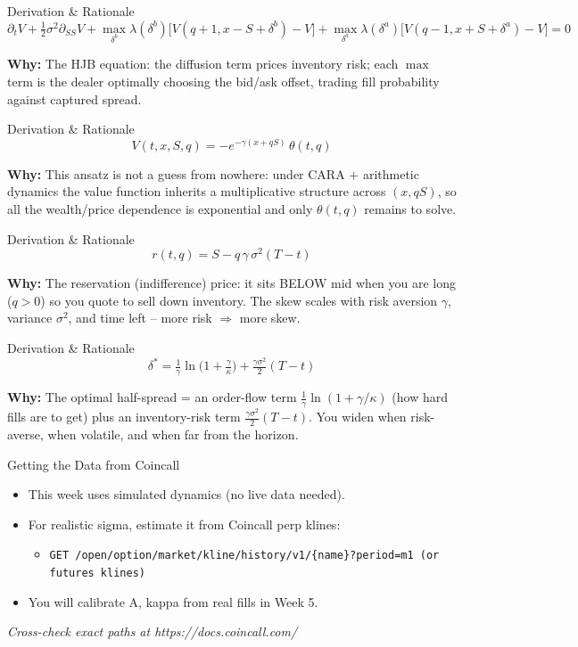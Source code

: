 \documentclass[aspectratio=169,10pt]{beamer}
\begin{document}
\begin{frame}{Derivation \& Rationale}
\[\partial_t V + \tfrac12\sigma^2 \partial_{SS} V + \max_{\delta^b}\lambda(\delta^b)\big[V(q{+}1,x{-}S{+}\delta^b)-V\big]+ \max_{\delta^a}\lambda(\delta^a)\big[V(q{-}1,x{+}S{+}\delta^a)-V\big]=0\]

\small\textbf{\color{ncsured}Why:} The HJB equation: the diffusion term prices inventory risk; each $\max$ term is the dealer optimally choosing the bid/ask offset, trading fill probability against captured spread.
\end{frame}

\begin{frame}{Derivation \& Rationale}
\[V(t,x,S,q) = -e^{-\gamma(x+qS)}\,\theta(t,q)\]

\small\textbf{\color{ncsured}Why:} This ansatz is not a guess from nowhere: under CARA $+$ arithmetic dynamics the value function inherits a multiplicative structure across $(x, qS)$, so all the wealth/price dependence is exponential and only $\theta(t,q)$ remains to solve.
\end{frame}

\begin{frame}{Derivation \& Rationale}
\[r(t,q) = S - q\,\gamma\,\sigma^2 (T-t)\]

\small\textbf{\color{ncsured}Why:} The reservation (indifference) price: it sits BELOW mid when you are long ($q>0$) so you quote to sell down inventory. The skew scales with risk aversion $\gamma$, variance $\sigma^2$, and time left -- more risk $\Rightarrow$ more skew.
\end{frame}

\begin{frame}{Derivation \& Rationale}
\[\delta^* = \tfrac{1}{\gamma}\ln\!\big(1+\tfrac{\gamma}{\kappa}\big) + \tfrac{\gamma\sigma^2}{2}(T-t)\]

\small\textbf{\color{ncsured}Why:} The optimal half-spread = an order-flow term $\tfrac1\gamma\ln(1+\gamma/\kappa)$ (how hard fills are to get) plus an inventory-risk term $\tfrac{\gamma\sigma^2}{2}(T-t)$. You widen when risk-averse, when volatile, and when far from the horizon.
\end{frame}

\begin{frame}{Getting the Data from Coincall}
\begin{itemize}
  \item This week uses simulated dynamics (no live data needed).
  \item For realistic sigma, estimate it from Coincall perp klines:
  \begin{itemize}\item \texttt{\small GET /open/option/market/kline/history/v1/\{name\}?period=m1  (or futures klines)}\end{itemize}
  \item You will calibrate A, kappa from real fills in Week 5.
\end{itemize}
\vspace{2pt}\tiny\textit{Cross-check exact paths at https://docs.coincall.com/}
\end{frame}
\end{document}
